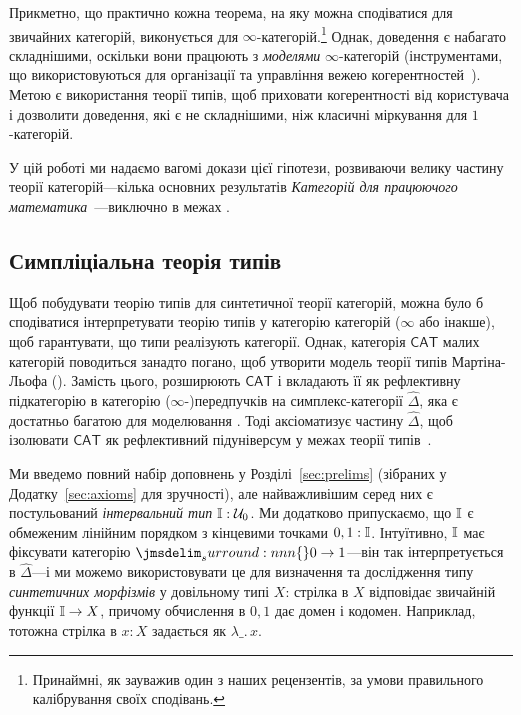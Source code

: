 \documentclass[12pt]{article}
\newcommand{\textcite}{\cite}
\newcommand{\parencite}{\cite}
\newcommand{\CAT}{\mathsf{CAT}}
\newcommand{\SIMP}{\Delta}
\newcommand{\PSH}[1]{\widehat{#1}}
\let\brc\DelimBrc
\begin{document}
Прикметно, що практично кожна теорема, на яку можна сподіватися для звичайних категорій, виконується для
$\infty$-категорій.\footnote{Принаймні, як зауважив один з наших рецензентів, за умови правильного калібрування своїх сподівань.} Однак,
доведення є набагато складнішими, оскільки вони працюють з \emph{моделями} $\infty$-категорій (інструментами, що використовуються для
організації та управління вежею когерентностей~\parencite{bergner:2018}). Метою \STT{} є використання
теорії типів, щоб приховати когерентності від користувача і дозволити доведення, які є не складнішими, ніж
класичні міркування для $1$-категорій.

У цій роботі ми надаємо вагомі докази цієї гіпотези, розвиваючи велику частину
теорії категорій---кілька основних результатів \emph{Категорій для працюючого
  математика}~\parencite{maclane:1978}---виключно в межах \STT{}.

\subsection{Симпліціальна теорія типів}

Щоб побудувати теорію типів для синтетичної теорії категорій, можна було б сподіватися інтерпретувати теорію типів у
категорію категорій ($\infty$ або інакше), щоб гарантувати, що типи реалізують категорії. Однак,
категорія $\CAT$ малих категорій поводиться занадто погано, щоб утворити модель теорії типів
Мартіна-Льофа (\MLTT{}). Замість цього, \textcite{riehl:2017} розширюють $\CAT$ і вкладають її як рефлективну
підкатегорію в категорію ($\infty$-)передпучків на симплекс-категорії $\PSH{\SIMP}$, яка є достатньо
багатою для моделювання \HoTT{}. Тоді \STT{} аксіоматизує частину $\PSH{\SIMP}$, щоб ізолювати $\CAT$ як
рефлективний підуніверсум у межах теорії типів~\parencite{rijke:2020}.

Ми введемо повний набір доповнень у Розділі~\ref{sec:prelims} (зібраних у Додатку~\ref{sec:axioms}
для зручності), але найважливішим серед них є постульований \emph{інтервальний тип}
$\Int : \Uni[0]$. Ми додатково припускаємо, що $\mathbb{I}$ є обмеженим лінійним порядком з кінцевими точками
$0,1 : \mathbb{I}$. Інтуїтивно, $\mathbb{I}$ має фіксувати категорію $\brc{0 \to 1}$---він так
інтерпретується в $\PSH{\SIMP}$---і ми можемо використовувати це для визначення та дослідження типу
\emph{синтетичних морфізмів} у довільному типі $X$: стрілка в $X$ відповідає звичайній
функції $\mathbb{I} \to X$, причому обчислення в $0,1$ дає домен і кодомен. Наприклад,
тотожна стрілка в $x : X$ задається як $\lambda \_.\,x$.
\end{document}
